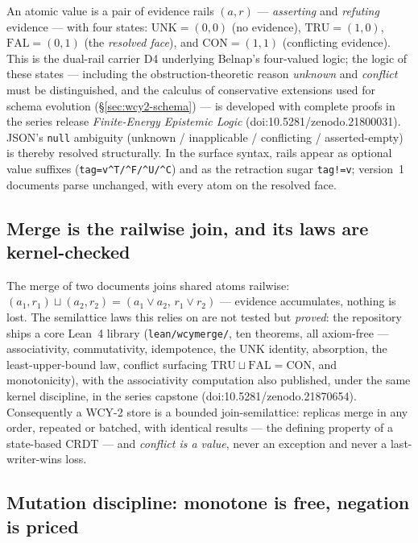 \documentclass[11pt,a4paper]{article}
\begin{document}
An atomic value is a pair of evidence rails $(a, r)$ ---
\emph{asserting} and \emph{refuting} evidence --- with four states:
$\mathrm{UNK} = (0,0)$ (no evidence), $\mathrm{TRU} = (1,0)$,
$\mathrm{FAL} = (0,1)$ (the \emph{resolved face}), and
$\mathrm{CON} = (1,1)$ (conflicting evidence). This is the dual-rail
carrier D4 underlying Belnap's four-valued logic; the logic of these
states --- including the obstruction-theoretic reason \emph{unknown} and
\emph{conflict} must be distinguished, and the calculus of conservative
extensions used for schema evolution (\S\ref{sec:wcy2-schema}) --- is
developed with complete proofs in the series release
\emph{Finite-Energy Epistemic Logic} (doi:10.5281/zenodo.21800031).
JSON's \texttt{null} ambiguity (unknown / inapplicable / conflicting /
asserted-empty) is thereby resolved structurally. In the surface syntax,
rails appear as optional value suffixes
(\texttt{tag=v\^{}T/\^{}F/\^{}U/\^{}C}) and as the retraction sugar
\texttt{tag!=v}; version~1 documents parse unchanged, with every atom on
the resolved face.

\subsection{Merge is the railwise join, and its laws are kernel-checked}

The merge of two documents joins shared atoms railwise:
$(a_1,r_1) \sqcup (a_2,r_2) = (a_1 \lor a_2,\, r_1 \lor r_2)$ ---
evidence accumulates, nothing is lost. The semilattice laws this relies
on are not tested but \emph{proved}: the repository ships a core Lean~4
library (\texttt{lean/wcymerge/}, ten theorems, all axiom-free ---
associativity, commutativity, idempotence, the $\mathrm{UNK}$ identity,
absorption, the least-upper-bound law, conflict surfacing
$\mathrm{TRU} \sqcup \mathrm{FAL} = \mathrm{CON}$, and monotonicity),
with the associativity computation also published, under the same kernel
discipline, in the series capstone (doi:10.5281/zenodo.21870654).
Consequently a WCY-2 store is a bounded join-semilattice: replicas merge
in any order, repeated or batched, with identical results --- the
defining property of a state-based CRDT --- and \emph{conflict is a
value}, never an exception and never a last-writer-wins loss.

\subsection{Mutation discipline: monotone is free, negation is priced}
\end{document}
